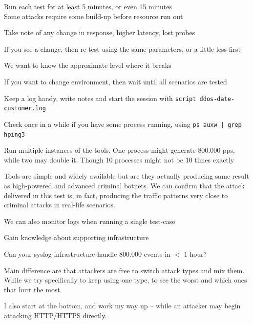 \documentclass[Screen16to9,17pt]{foils}
\begin{document}

\begin{list2}
\item Run each test for at least 5 minutes, or even 15 minutes\\
Some attacks require some build-up before resource run out
\item Take note of any change in response, higher latency, lost probes
\item If you see a change, then re-test using the same parameters, or a little less first
\item We want to know the approximate level where it breaks
\item If you want to change environment, then wait until all scenarios are tested
\item Keep a log handy, write notes and start the session with \verb+script ddos-date-customer.log+
\item Check once in a while if you have some process running, using \verb+ps auxw | grep hping3+
\item Run multiple instances of the tools. One process might generate 800.000 pps, while two may double it. Though 10 processes might not be 10 times exactly
\end{list2}


Tools are simple and widely available but are they actually producing same result as high-powered and advanced criminal botnets. We can confirm that the attack delivered in this test is, in fact, producing the traffic patterns very close to criminal attacks in real-life scenarios.

\begin{list2}
\item We can also monitor logs when running a single test-case
\item Gain knowledge about supporting infrastructure
\item Can your syslog infrastructure handle 800.000 events in $<$ 1 hour?
\end{list2}

Main difference are that attackers are free to switch attack types and mix them. While we try specifically to keep using one type, to see the worst and which ones that hurt the most.

I also start at the bottom, and work my way up -- while an attacker may begin attacking HTTP/HTTPS directly.

\end{document}
